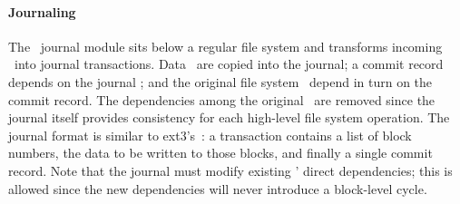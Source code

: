 
\paragraph{Journaling}
\label{sec:using:journal}

\begin{comment}
In a journaling file system, changes to disk structures are grouped into
\emph{transactions} that commit atomically.
%
Any change in a transaction is first copied into an on-disk journal.
%
A single \emph{commit record} block is written to the journal once the
transaction's changes are stably committed there.
%
This record commits the transaction itself, allowing its changes to be
written into the main body of the file system in any order.
%
If the system crashes, the journal information is used to recover the main
file system from its possibly-incomplete state.
%
Once all the transaction's changes are written, a \emph{completion record}
is written to the journal to mark the transaction as complete; that portion
of the journal may now be reused.
\end{comment}

\begin{comment}
the journal point the transaction itself has the commit record
has been written, the changes (which collectively are called a
\emph{transaction}) are considered to have been made to the file system: if
the system crashes, the data from the journal will be copied into the main
file system as part of recovery. After the commit record has been written,
the original changes may be written in any order desired, and once they
have been written, the commit record may be erased and the portion of the
journal storing the data it referenced can be reused.
\end{comment}

The \Kudos\ journal module sits below a regular file system and transforms
incoming \patches\ into journal transactions.
%
Data \patches\ are copied into the journal; a commit record depends on the
journal \patches; and the original file system \patches\ depend in turn on the
commit record.
%
The dependencies among the original \patches\ are removed since the journal
itself provides consistency for each high-level file system operation.
%
The journal format is similar to ext3's~\cite{tweedie98journaling}: a
transaction contains a list of block numbers, the data to be written to
those blocks, and finally a single commit record.
%
%
Note that the journal must modify existing \patches' direct dependencies;
this is allowed since the new dependencies will never introduce a
block-level cycle.

